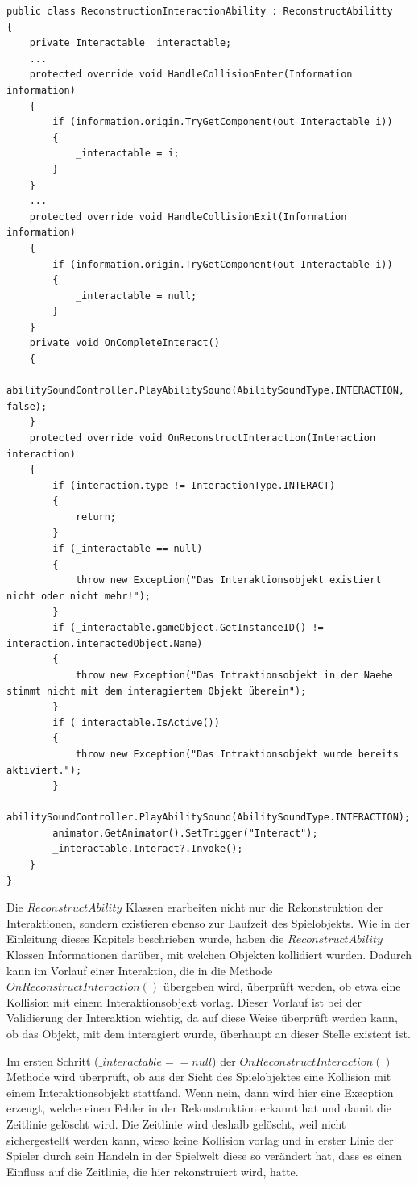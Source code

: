 \begin{lstlisting}[caption={Ausschnitt aus ReconstructionInteractionAbility.cs}, label={lst:reconstruction-interaction-ability}]
public class ReconstructionInteractionAbility : ReconstructAbilitty
{
    private Interactable _interactable;
    ...
    protected override void HandleCollisionEnter(Information information)
    {
        if (information.origin.TryGetComponent(out Interactable i))
        {
            _interactable = i;
        }
    }
    ...
    protected override void HandleCollisionExit(Information information)
    {
        if (information.origin.TryGetComponent(out Interactable i))
        {
            _interactable = null;
        }
    }
    private void OnCompleteInteract()
    {
        abilitySoundController.PlayAbilitySound(AbilitySoundType.INTERACTION, false);
    }
    protected override void OnReconstructInteraction(Interaction interaction)
    {
        if (interaction.type != InteractionType.INTERACT)
        {
            return;
        }
        if (_interactable == null)
        {
            throw new Exception("Das Interaktionsobjekt existiert nicht oder nicht mehr!");
        }
        if (_interactable.gameObject.GetInstanceID() != interaction.interactedObject.Name)
        {
            throw new Exception("Das Intraktionsobjekt in der Naehe stimmt nicht mit dem interagiertem Objekt überein");
        }
        if (_interactable.IsActive())
        {
            throw new Exception("Das Intraktionsobjekt wurde bereits aktiviert.");
        }
        abilitySoundController.PlayAbilitySound(AbilitySoundType.INTERACTION);
        animator.GetAnimator().SetTrigger("Interact");
        _interactable.Interact?.Invoke();
    }
}
\end{lstlisting}

Die $ReconstructAbility$ Klassen erarbeiten nicht nur die Rekonstruktion der Interaktionen, sondern existieren ebenso zur Laufzeit des Spielobjekts. Wie in der Einleitung dieses Kapitels beschrieben wurde, haben die $ReconstructAbility$ Klassen Informationen darüber, mit welchen Objekten kollidiert wurden. Dadurch kann im Vorlauf einer Interaktion, die in die Methode $OnReconstructInteraction()$ übergeben wird, überprüft werden, ob etwa eine Kollision mit einem Interaktionsobjekt vorlag. Dieser Vorlauf ist bei der Validierung der Interaktion wichtig, da auf diese Weise überprüft werden kann, ob das Objekt, mit dem interagiert wurde, überhaupt an dieser Stelle existent ist. 

Im ersten Schritt ($\_interactable == null$) der $OnReconstructInteraction()$ Methode wird überprüft, ob aus der Sicht des Spielobjektes eine Kollision mit einem Interaktionsobjekt stattfand. Wenn nein, dann wird hier eine Execption erzeugt, welche einen Fehler in der Rekonstruktion erkannt hat und damit die Zeitlinie gelöscht wird. Die Zeitlinie wird deshalb gelöscht, weil nicht sichergestellt werden kann, wieso keine Kollision vorlag und in erster Linie der Spieler durch sein Handeln in der Spielwelt diese so verändert hat, dass es einen Einfluss auf die Zeitlinie, die hier rekonstruiert wird, hatte.

